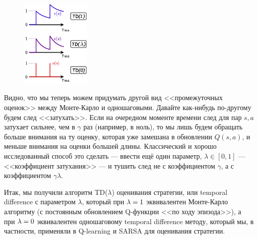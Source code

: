 \begin{figure}
\centering
\includegraphics[width=0.3\textwidth]{Images/Traces.png}
\vspace{-1.5cm}
\end{figure}
Видно, что мы теперь можем придумать другой вид <<промежуточных оценок>> между Монте-Карло и одношаговыми. Давайте как-нибудь по-другому будем след <<затухать>>. Если на очередном моменте времени след для пар $s, a$ затухает сильнее, чем в $\gamma$ раз (например, в ноль), то мы лишь будем обращать больше внимания на ту оценку, которая уже замешана в обновлении $Q(s, a)$, и меньше внимания на оценки большей длины. Классический и хорошо исследованный способ это сделать --- ввести ещё один параметр, $\lambda \in [0, 1]$ --- <<коэффициент затухания>> --- и тушить след не с коэффициентом $\gamma$, а с коэффициентом $\gamma \lambda$.

Итак, мы получили алгоритм TD($\lambda$) оценивания стратегии, или temporal difference с параметром $\lambda$, который при $\lambda \HM= 1$ эквивалентен Монте-Карло алгоритму (с постоянным обновлением Q-функции <<по ходу эпизода>>), а при $\lambda \HM = 0$ эквивалентен одношаговому temporal difference методу, который мы, в частности, применяли в Q-learning и SARSA для оценивания стратегии.

